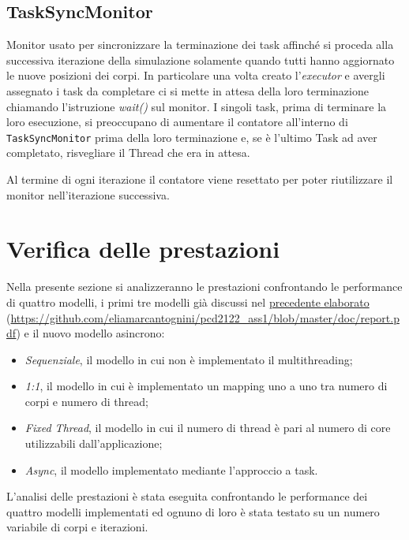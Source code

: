 \subsection{TaskSyncMonitor}
\label{subs:task_sync_m}

Monitor usato per sincronizzare la terminazione dei task affinché si proceda alla successiva iterazione della simulazione solamente quando tutti hanno aggiornato le nuove posizioni dei corpi.
%
In particolare una volta creato l'\textit{executor} e avergli assegnato i task da completare ci si mette in attesa della loro terminazione chiamando l'istruzione \textit{wait()} sul monitor.
%
I singoli task, prima di terminare la loro esecuzione, si preoccupano di aumentare il contatore all'interno di \texttt{TaskSyncMonitor} prima della loro terminazione e, se è l'ultimo Task ad aver completato, risvegliare il Thread che era in attesa.

Al termine di ogni iterazione il contatore viene resettato per poter riutilizzare il monitor nell'iterazione successiva.


\section{Verifica delle prestazioni} \label{section:prestazioni}

Nella presente sezione si analizzeranno le prestazioni confrontando le performance di quattro modelli, i primi tre modelli già discussi nel \href{https://github.com/eliamarcantognini/pcd2122_ass1/blob/master/doc/report.pdf}{precedente elaborato} (\url{https://github.com/eliamarcantognini/pcd2122_ass1/blob/master/doc/report.pdf}) e il nuovo modello asincrono:
\begin{itemize}
    \item \textit{Sequenziale}, il modello in cui non è implementato il multithreading;
    \item \textit{1:1}, il modello in cui è implementato un mapping uno a uno tra numero di corpi e numero di thread;
    \item \textit{Fixed Thread}, il modello in cui il numero di thread è pari al numero di core utilizzabili dall'applicazione;
    \item \textit{Async}, il modello implementato mediante l'approccio a task.
\end{itemize}

L'analisi delle prestazioni è stata eseguita confrontando le performance dei quattro modelli implementati ed ognuno di loro è stata testato su un numero variabile di corpi e iterazioni.

